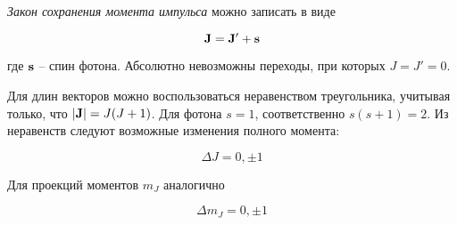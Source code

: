 \textit{Закон сохранения момента импульса} можно записать в виде

\begin{equation}
    \mathbf J = \mathbf J' + \mathbf s
\end{equation}

\noindent
где $\mathbf s$ -- спин фотона. Абсолютно невозможны переходы, при которых $J =  J' = 0$.

Для длин векторов можно воспользоваться неравенством треугольника, учитывая только, что $\left| \mathbf J \right| = J (J + 1)$. Для фотона $s = 1$, соответственно $s (s + 1) = 2$. Из неравенств следуют возможные изменения полного момента:

\begin{equation}
    \Delta J = 0, \pm 1
\end{equation}

Для проекций моментов $m_J$ аналогично

\begin{equation}
    \Delta m_J = 0, \pm 1
\end{equation}